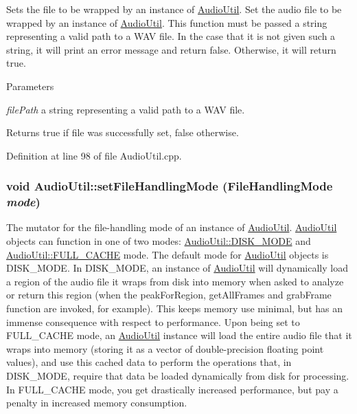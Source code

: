 Sets the file to be wrapped by an instance of \hyperlink{classAudioUtil}{AudioUtil}. Set the audio file to be wrapped by an instance of \hyperlink{classAudioUtil}{AudioUtil}. This function must be passed a string representing a valid path to a WAV file. In the case that it is not given such a string, it will print an error message and return false. Otherwise, it will return true.


\begin{DoxyParams}{Parameters}
\item[{\em filePath}]a string representing a valid path to a WAV file. \end{DoxyParams}
\begin{DoxyReturn}{Returns}
true if file was successfully set, false otherwise. 
\end{DoxyReturn}


Definition at line 98 of file AudioUtil.cpp.\hypertarget{classAudioUtil_aa6e29dfd59fb16462f5ee00ce7c311db}{
\subsubsection[{setFileHandlingMode}]{\setlength{\rightskip}{0pt plus 5cm}void AudioUtil::setFileHandlingMode (FileHandlingMode {\em mode})}}
\label{classAudioUtil_aa6e29dfd59fb16462f5ee00ce7c311db}


The mutator for the file-\/handling mode of an instance of \hyperlink{classAudioUtil}{AudioUtil}. \hyperlink{classAudioUtil}{AudioUtil} objects can function in one of two modes: \hyperlink{}{AudioUtil::DISK\_\-MODE} and \hyperlink{}{AudioUtil::FULL\_\-CACHE} mode. The default mode for \hyperlink{classAudioUtil}{AudioUtil} objects is DISK\_\-MODE. In DISK\_\-MODE, an instance of \hyperlink{classAudioUtil}{AudioUtil} will dynamically load a region of the audio file it wraps from disk into memory when asked to analyze or return this region (when the peakForRegion, getAllFrames and grabFrame function are invoked, for example). This keeps memory use minimal, but has an immense consequence with respect to performance. Upon being set to FULL\_\-CACHE mode, an \hyperlink{classAudioUtil}{AudioUtil} instance will load the entire audio file that it wraps into memory (storing it as a vector of double-\/precision floating point values), and use this cached data to perform the operations that, in DISK\_\-MODE, require that data be loaded dynamically from disk for processing. In FULL\_\-CACHE mode, you get drastically increased performance, but pay a penalty in increased memory consumption.


